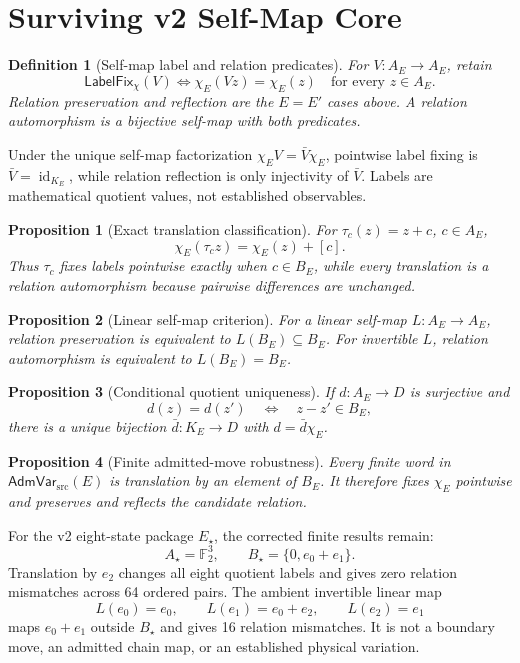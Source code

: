 \documentclass[11pt]{article}
\newtheorem{definition}{Definition}
\newtheorem{proposition}{Proposition}
\newcommand{\Ftwo}{\mathbb F_2}
\newcommand{\AdmVar}{\mathsf{AdmVar}_{\mathrm{src}}}
\newcommand{\LabelFix}{\mathsf{LabelFix}_{\chi}}
\begin{document}
\section{Surviving v2 Self-Map Core}

\begin{definition}[Self-map label and relation predicates]
For \(V:A_E\to A_E\), retain
\[
\LabelFix(V)\Longleftrightarrow
\chi_E(Vz)=\chi_E(z)\quad\text{for every }z\in A_E.
\]
Relation preservation and reflection are the \(E=E'\) cases above. A
relation automorphism is a bijective self-map with both predicates.
\end{definition}

Under the unique self-map factorization
\(\chi_EV=\bar V\chi_E\), pointwise label fixing is
\(\bar V=\operatorname{id}_{K_E}\), while relation reflection is only
injectivity of \(\bar V\). Labels are mathematical quotient values, not
established observables.

\begin{proposition}[Exact translation classification]
For \(\tau_c(z)=z+c\), \(c\in A_E\),
\[
\chi_E(\tau_cz)=\chi_E(z)+[c].
\]
Thus \(\tau_c\) fixes labels pointwise exactly when \(c\in B_E\), while every
translation is a relation automorphism because pairwise differences are
unchanged.
\end{proposition}

\begin{proposition}[Linear self-map criterion]
For a linear self-map \(L:A_E\to A_E\), relation preservation is equivalent
to \(L(B_E)\subseteq B_E\). For invertible \(L\), relation automorphism is
equivalent to \(L(B_E)=B_E\).
\end{proposition}

\begin{proposition}[Conditional quotient uniqueness]
If \(d:A_E\to D\) is surjective and
\[
d(z)=d(z')\quad\Longleftrightarrow\quad z-z'\in B_E,
\]
there is a unique bijection \(\bar d:K_E\to D\) with
\(d=\bar d\chi_E\).
\end{proposition}

\begin{proposition}[Finite admitted-move robustness]
Every finite word in \(\AdmVar(E)\) is translation by an element of \(B_E\).
It therefore fixes \(\chi_E\) pointwise and preserves and reflects the
candidate relation.
\end{proposition}

For the v2 eight-state package \(E_\star\), the corrected finite results
remain:
\[
A_\star=\Ftwo^3,\qquad B_\star=\{0,e_0+e_1\}.
\]
Translation by \(e_2\) changes all eight quotient labels and gives zero
relation mismatches across 64 ordered pairs. The ambient invertible linear map
\[
L(e_0)=e_0,\qquad L(e_1)=e_0+e_2,\qquad L(e_2)=e_1
\]
maps \(e_0+e_1\) outside \(B_\star\) and gives 16 relation mismatches. It is
not a boundary move, an admitted chain map, or an established physical
variation.
\end{document}
